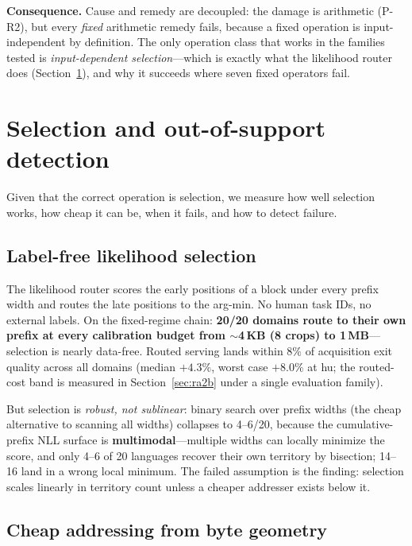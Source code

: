 \documentclass[11pt]{article}
\theoremstyle{definition}\newtheorem{definition}{Definition}
\theoremstyle{remark}\newtheorem{remark}{Remark}
\begin{document}
\textbf{Consequence.} Cause and remedy are decoupled: the damage is arithmetic
(P-R2), but every \emph{fixed} arithmetic remedy fails, because a fixed operation is
input-independent by definition. The only operation class that works in the families tested is
\emph{input-dependent selection}---which is exactly what the likelihood router does
(Section~\ref{sec:selection}), and why it succeeds where seven fixed operators fail.

\section{Selection and out-of-support detection}
\label{sec:selection}

Given that the correct operation is selection, we measure how well selection works, how
cheap it can be, when it fails, and how to detect failure.

\subsection{Label-free likelihood selection}

The likelihood router scores the early positions of a block under every prefix width and
routes the late positions to the arg-min. No human task IDs, no external labels. On the
fixed-regime chain: \textbf{20/20 domains route to their own prefix at every calibration
budget from $\sim$4\,KB (8 crops) to 1\,MB}---selection is nearly data-free. Routed
serving lands within $8\%$ of acquisition exit quality across all domains (median
$+4.3\%$, worst case $+8.0\%$ at hu; the routed-cost band is measured in
Section~\ref{sec:ra2b} under a single evaluation family).

But selection is \emph{robust, not sublinear}: binary search over prefix widths (the
cheap alternative to scanning all widths) collapses to 4--6/20, because the
cumulative-prefix NLL surface is \textbf{multimodal}---multiple widths can locally
minimize the score, and only 4--6 of 20 languages recover their own territory by bisection; 14--16 land in a wrong local minimum. The failed
assumption is the finding: selection scales linearly in territory count unless a cheaper
addresser exists below it.

\subsection{Cheap addressing from byte geometry}
\end{document}
